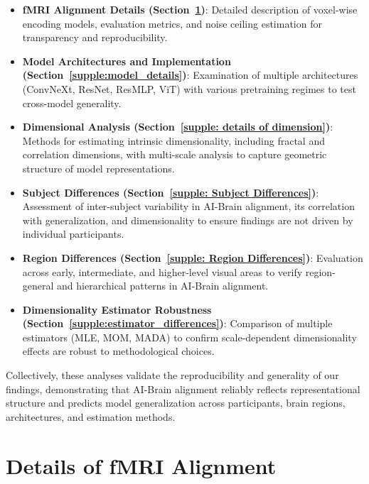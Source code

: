 \documentclass{article}
\theoremstyle{plain}
\theoremstyle{definition}
\theoremstyle{remark}
\begin{document}
\begin{itemize}
    \item \textbf{fMRI Alignment Details (Section~\ref{supple: fMRI Alignment})}: Detailed description of voxel-wise encoding models, evaluation metrics, and noise ceiling estimation for transparency and reproducibility.
    
    \item \textbf{Model Architectures and Implementation (Section~\ref{supple:model_details})}: Examination of multiple architectures (ConvNeXt, ResNet, ResMLP, ViT) with various pretraining regimes to test cross-model generality.
    
    \item \textbf{Dimensional Analysis (Section~\ref{supple: details of dimension})}: Methods for estimating intrinsic dimensionality, including fractal and correlation dimensions, with multi-scale analysis to capture geometric structure of model representations.
    
    \item \textbf{Subject Differences (Section~\ref{supple: Subject Differences})}: Assessment of inter-subject variability in AI-Brain alignment, its correlation with generalization, and dimensionality to ensure findings are not driven by individual participants.
    
    \item \textbf{Region Differences (Section~\ref{supple: Region Differences})}: Evaluation across early, intermediate, and higher-level visual areas to verify region-general and hierarchical patterns in AI-Brain alignment.
    
    \item \textbf{Dimensionality Estimator Robustness (Section~\ref{supple:estimator_differences})}: Comparison of multiple estimators (MLE, MOM, MADA) to confirm scale-dependent dimensionality effects are robust to methodological choices.
\end{itemize}

Collectively, these analyses validate the reproducibility and generality of our findings, demonstrating that AI-Brain alignment reliably reflects representational structure and predicts model generalization across participants, brain regions, architectures, and estimation methods.








\section{Details of fMRI Alignment}
\label{supple: fMRI Alignment}
\end{document}
